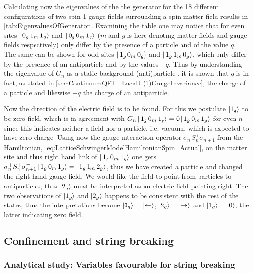 \documentclass[../main.tex]{subfiles} %
\begin{document}
%
Calculating now the eigenvalues of the the generator for the 18 different configurations of two spin-1 gauge fields surrounding a spin-\half matter field results in \cref{tab:EigenvaluesOfGenerator}. Examining the table one may notice that for even sites $\ket{\, 0_g\, 1_m\, 1_g}$ and $\ket{\, 0_g\, 0_m\, 1_g}$ ($m$ and $g$ is here denoting matter fields and gauge fields respectively) only differ by the presence of a particle and of the value $q$. The same can be shown for odd sites $\ket{\, 1_g\, 0_m\, 0_g}$ and $\ket{\, 1_g\, 1_m\, 0_g}$, which only differ by the presence of an antiparticle and by the values $-q$. Thus by understanding the eigenvalue of $G_n$ as a static background (anti)particle \cite{panyella_masterThesis_2019}, it is shown that $q$ is in fact, as stated in \cref{sec:ContinuumQFT_LocalU(1)GaugeInvariance}, the charge of a particle and likewise $-q$ the charge of an antiparticle.

Now the direction of the electric field is to be found. For this we postulate $\ket{1_g}$ to be zero field, which is in agreement with $G_n \ket{\, 1_g\, 0_m\, 1_g} = 0 \ket{\, 1_g\, 0_m\, 1_g}$ for even $n$ since this indicates neither a field nor a particle, i.e. vacuum, which is expected to have zero charge. Using now the gauge interaction operator $\sigma_n^+ S_n^+ \sigma_{n+1}^-$ from the Hamiltonian, \cref{eq:LatticeSchwingerModelHamiltonianSpin_Actual}, on the matter site and thus right hand link of $\ket{\, 1_g\, 0_m\, 1_g}$ one gets $\sigma_n^+ S_n^+ \sigma_{n+1}^- \ket{\, 1_g\, 0_m\, 1_g} = \ket{\, 1_g\, 1_m\, 2_g}$, thus we have created a particle and changed the right hand gauge field. We would like the field to point from particles to antiparticles, thus $\ket{2_g}$ must be interpreted as an electric field pointing right. The two observations of $\ket{1_g}$ and $\ket{2_g}$ happens to be consistent with the rest of the states, thus the interpretations become $\ket{0_g} = \ket{\leftarrow}$, $\ket{2_g} = \ket{\rightarrow}$ and $\ket{1_g} = \ket{0}$, the latter indicating zero field.



\subsection{Confinement and string breaking} \label{sec:ConfienementAndStringBreakingAnalyticalAndNumerical}

\subsubsection{Analytical study: Variables favourable for string breaking}
\end{document}
